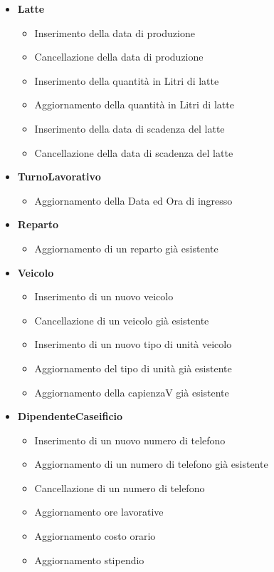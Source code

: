 \documentclass[12pt]{report}
\begin{document}
\begin{itemize}
\begin{itemize}
	\end{itemize}
	\item \textbf{Latte}
	\begin{itemize}
	\item Inserimento della data di produzione
	\item Cancellazione della data di produzione
	\item Inserimento della quantità in Litri di latte
	\item Aggiornamento della quantità in Litri di latte
	\item Inserimento della data di scadenza del latte
	\item Cancellazione della data di scadenza del latte
	\end{itemize}
	
	\item \textbf{TurnoLavorativo}
	\begin{itemize}
	\item Aggiornamento della Data ed Ora di ingresso
	
	\end{itemize}
	\item \textbf{Reparto}
	\begin{itemize}
	\item Aggiornamento di un reparto già esistente
	
	\end{itemize}
	\item \textbf{Veicolo}
	\begin{itemize}
	\item Inserimento di un nuovo veicolo
	\item Cancellazione di un veicolo già esistente
	\item Inserimento di un nuovo tipo di unità veicolo
	\item Aggiornamento del tipo di unità già esistente
	\item Aggiornamento della capienzaV già esistente
	\end{itemize}
	
	\item \textbf{DipendenteCaseificio}
	\begin{itemize}
	\item Inserimento di un nuovo numero di telefono
	\item Aggiornamento di un numero di telefono già esistente
	\item Cancellazione di un  numero di telefono
	\item Aggiornamento ore lavorative
	\item Aggiornamento costo orario
	\item Aggiornamento stipendio
	\end{itemize}
	

\end{itemize}
\end{document}
